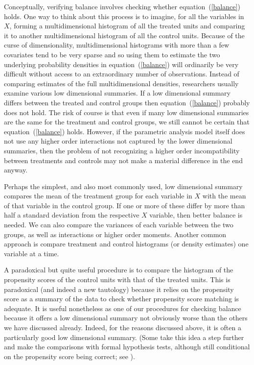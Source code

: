 \documentclass[11pt,titlepage]{article}
\begin{document}
Conceptually, verifying balance involves checking whether
equation~(\ref{balance}) holds.  One way to think about this process
is to imagine, for all the variables in $X$, forming a
multidimensional histogram of all the treated units and comparing it
to another multidimensional histogram of all the control units.
Because of the curse of dimensionality, multidimensional histograms
with more than a few covariates tend to be very sparse and so using
them to estimate the two underlying probability densities in
equation~(\ref{balance}) will ordinarily be very difficult without
access to an extraordinary number of observations.  Instead of
comparing estimates of the full multidimensional densities,
researchers usually examine various low dimensional summaries.  If a
low dimensional summary differs between the treated and control groups
then equation~(\ref{balance}) probably does not hold.  The risk of
course is that even if many low dimensional summaries are the same for
the treatment and control groups, we still cannot be certain that
equation~(\ref{balance}) holds.  However, if the parametric analysis
model itself does not use any higher order interactions not captured
by the lower dimensional summaries, then the problem of not
recognizing a higher order incompatibility between treatments and
controls may not make a material difference in the end anyway.

Perhaps the simplest, and also most commonly used, low dimensional
summary compares the mean of the treatment group for each variable in
$X$ with the mean of that variable in the control group.  If one or
more of these differ by more than half a standard deviation from the
respective $X$ variable, then better balance is needed.  We can also
compare the variances of each variable between the two groups, as well
as interactions or higher order moments.  Another common approach is
compare treatment and control histograms (or density estimates) one
variable at a time.

A paradoxical but quite useful procedure is to compare the histogram
of the propensity scores of the control units with that of the treated
units. This is paradoxical (and indeed a new tautology) because it
relies on the propensity score as a summary of the data to check
whether propensity score matching is adequate.  It is useful
nonetheless as one of our procedures for checking balance because it
offers a low dimensional summary not obviously worse than the others
we have discussed already.  Indeed, for the reasons discussed above,
it is often a particularly good low dimensional summary. (Some take
this idea a step further and make the comparisons with formal
hypothesis tests, although still conditional on the propensity score
being correct; see \citet{Sekhon04b}).
\end{document}
